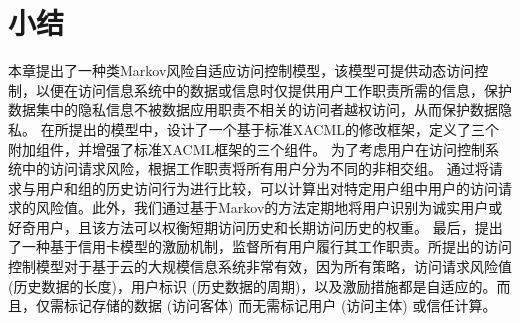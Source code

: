 \section{小结}
\label{sec:Conclusion}

本章提出了一种类Markov风险自适应访问控制模型，该模型可提供动态访问控制，以便在访问信息系统中的数据或信息时仅提供用户工作职责所需的信息，保护数据集中的隐私信息不被数据应用职责不相关的访问者越权访问，从而保护数据隐私。 在所提出的模型中，设计了一个基于标准XACML的修改框架，定义了三个附加组件，并增强了标准XACML框架的三个组件。 为了考虑用户在访问控制系统中的访问请求风险，根据工作职责将所有用户分为不同的非相交组。 通过将请求与用户和组的历史访问行为进行比较，可以计算出对特定用户组中用户的访问请求的风险值。此外，我们通过基于Markov的方法定期地将用户识别为诚实用户或好奇用户，且该方法可以权衡短期访问历史和长期访问历史的权重。 最后，提出了一种基于信用卡模型的激励机制，监督所有用户履行其工作职责。所提出的访问控制模型对于基于云的大规模信息系统非常有效，因为所有策略，访问请求风险值 (历史数据的长度)，用户标识 (历史数据的周期)，以及激励措施都是自适应的。而且，仅需标记存储的数据 (访问客体) 而无需标记用户 (访问主体) 或信任计算。
